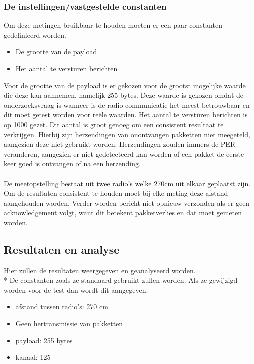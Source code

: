 \documentclass{article}
\begin{document}
\subsubsection{De instellingen/vastgestelde constanten}
Om deze metingen bruikbaar te houden moeten er een paar constanten gedefinieerd worden.
\begin{itemize}
	\item De grootte van de payload
	\item Het aantal te versturen berichten
\end{itemize}
Voor de grootte van de payload is er gekozen voor de grootst mogelijke waarde die deze kan aannemen, namelijk 255 bytes. Deze waarde is gekozen omdat de onderzoeksvraag is wanneer is de radio communicatie het meest betrouwbaar en dit moet getest worden voor re\"{e}le waarden. 
Het aantal te versturen berichten is op 1000 gezet. Dit aantal is groot genoeg om een consistent resultaat te verkrijgen. Hierbij zijn herzendingen van onontvangen pakketten niet meegeteld, aangezien deze niet gebruikt worden. Herzendingen zouden immers de PER veranderen, aangezien er niet gedetecteerd kan worden of een pakket de eerste keer goed is ontvangen of na een herzending.
\\
\\
De meetopstelling bestaat uit twee radio's welke 270cm uit elkaar geplaatst zijn. Om de resultaten consistent te houden moet bij elke meting deze afstand aangehouden worden. 
Verder worden bericht niet opnieuw verzonden als er geen acknowledgement volgt, want dit betekent pakketverlies en dat moet gemeten worden. 

\subsection{Resultaten en analyse}
Hier zullen de resultaten weergegeven en geanalyseerd worden. \\*
  De constanten zoals ze standaard gebruikt zullen worden. Als ze gewijzigd worden voor de test dan wordt dit aangegeven. 
  \begin{itemize}
  	\item afstand tussen radio's: 270 cm
  	\item Geen hertransmissie van pakketten
  	\item payload: 255 bytes
  	\item kanaal: 125
  \end{itemize}
  
\end{document}

